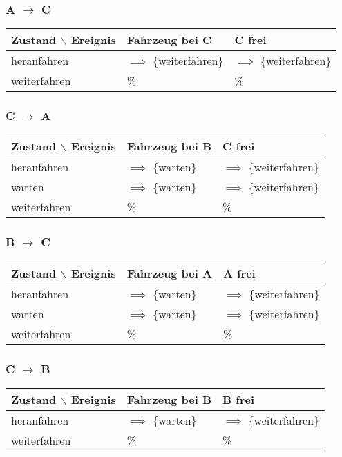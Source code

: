 \documentclass[koma,a4paper,10pt]{scrartcl}
\begin{document}
\subsubsection{A $\to$ C}
\label{sec-4-2-2}
\begin{center}
\begin{tabular}{lll}
Zustand $\backslash$ Ereignis & Fahrzeug bei C & C frei\\
\hline
heranfahren & $\implies$ \{weiterfahren\} & $\implies$ \{weiterfahren\}\\
weiterfahren & \% & \%\\
\end{tabular}
\end{center}

\subsubsection{C $\to$ A}
\label{sec-4-2-3}
\begin{center}
\begin{tabular}{lll}
Zustand $\backslash$ Ereignis & Fahrzeug bei B & C frei\\
\hline
heranfahren & $\implies$ \{warten\} & $\implies$ \{weiterfahren\}\\
warten & $\implies$ \{warten\} & $\implies$ \{weiterfahren\}\\
weiterfahren & \% & \%\\
\end{tabular}
\end{center}

\subsubsection{B $\to$ C}
\label{sec-4-2-4}
\begin{center}
\begin{tabular}{lll}
Zustand $\backslash$ Ereignis & Fahrzeug bei A & A frei\\
\hline
heranfahren & $\implies$ \{warten\} & $\implies$ \{weiterfahren\}\\
warten & $\implies$ \{warten\} & $\implies$ \{weiterfahren\}\\
weiterfahren & \% & \%\\
\end{tabular}
\end{center}

\subsubsection{C $\to$ B}
\label{sec-4-2-5}
\begin{center}
\begin{tabular}{lll}
Zustand $\backslash$ Ereignis & Fahrzeug bei B & B frei\\
\hline
heranfahren & $\implies$ \{warten\} & $\implies$ \{weiterfahren\}\\
weiterfahren & \% & \%\\
\end{tabular}
\end{center}
\end{document}
